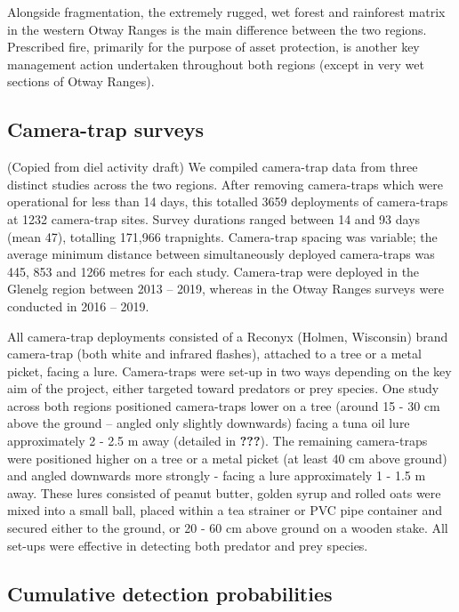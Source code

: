 \documentclass[11pt,a4paper,titlepage,twoside,openright]{style/unimelbthesis}
\begin{document}
\begin{mainmatter}
Alongside fragmentation, the extremely rugged, wet forest and rainforest matrix in the western Otway Ranges is the main difference between the two regions. Prescribed fire, primarily for the purpose of asset protection, is another key management action undertaken throughout both regions (except in very wet sections of Otway Ranges).

\hypertarget{camera-trap-surveys}{%
\subsection{Camera-trap surveys}\label{camera-trap-surveys}}

(Copied from diel activity draft)
We compiled camera-trap data from three distinct studies across the two regions. After removing camera-traps which were operational for less than 14 days, this totalled 3659 deployments of camera-traps at 1232 camera-trap sites. Survey durations ranged between 14 and 93 days (mean 47), totalling 171,966 trapnights. Camera-trap spacing was variable; the average minimum distance between simultaneously deployed camera-traps was 445, 853 and 1266 metres for each study. Camera-trap were deployed in the Glenelg region between 2013 -- 2019, whereas in the Otway Ranges surveys were conducted in 2016 -- 2019.

All camera-trap deployments consisted of a Reconyx (Holmen, Wisconsin) brand camera-trap (both white and infrared flashes), attached to a tree or a metal picket, facing a lure. Camera-traps were set-up in two ways depending on the key aim of the project, either targeted toward predators or prey species. One study across both regions positioned camera-traps lower on a tree (around 15 - 30 cm above the ground -- angled only slightly downwards) facing a tuna oil lure approximately 2 - 2.5 m away (detailed in {\textbf{???}}). The remaining camera-traps were positioned higher on a tree or a metal picket (at least 40 cm above ground) and angled downwards more strongly - facing a lure approximately 1 - 1.5 m away. These lures consisted of peanut butter, golden syrup and rolled oats were mixed into a small ball, placed within a tea strainer or PVC pipe container and secured either to the ground, or 20 - 60 cm above ground on a wooden stake. All set-ups were effective in detecting both predator and prey species.

\hypertarget{cumulative-detection-probabilities}{%
\subsection{Cumulative detection probabilities}\label{cumulative-detection-probabilities}}


\end{mainmatter}
\end{document}
